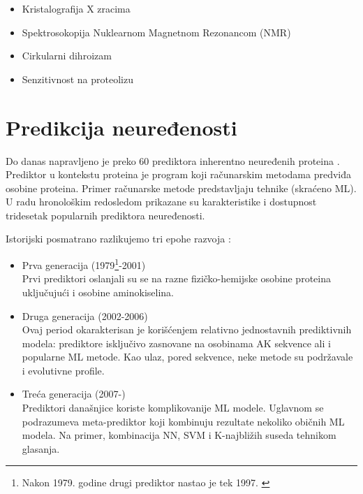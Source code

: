 \begin{itemize}
  \item Kristalografija X zracima  
  \item Spektrosokopija Nuklearnom Magnetnom Rezonancom (NMR) 
  \item Cirkularni dihroizam 
  \item Senzitivnost na proteolizu 
\end{itemize}


\section{Predikcija neuređenosti}

Do danas napravljeno je preko 60 prediktora inherentno neuređenih proteina
\parencite{Meng2017}. Prediktor u kontekstu proteina je program koji 
računarskim metodama predviđa osobine proteina. Primer računarske metode
predstavljaju tehnike  (skraćeno ML).  U radu
\parencite{Meng_c2017} hronološkim redosledom prikazane su karakteristike i
dostupnost tridesetak popularnih prediktora neuređenosti.


Istorijski posmatrano razlikujemo tri epohe razvoja \parencite{Meng_c2017}:
\begin{itemize}
  \item Prva generacija (1979\footnote{
      Nakon 1979. godine drugi prediktor nastao je tek 1997.
      \parencite{Meng_c2017} }-2001)\\
    Prvi prediktori oslanjali su se na razne fizičko-hemijske osobine proteina
    uključujući i osobine aminokiselina. 

  \item Druga generacija (2002-2006)\\
    Ovaj period okarakterisan je korišćenjem relativno jednostavnih
    prediktivnih modela: prediktore isključivo zasnovane na osobinama AK
    sekvence ali i popularne ML metode. Kao ulaz, pored sekvence, neke metode su
    podržavale i evolutivne profile.

  \item Treća generacija (2007-)\\
    Prediktori današnjice koriste komplikovanije ML modele. Uglavnom  se
    podrazumeva meta-prediktor koji kombinuju rezultate nekoliko običnih ML
    modela. Na primer, kombinacija NN, SVM i K-najbližih suseda tehnikom
    glasanja.

\end{itemize}


